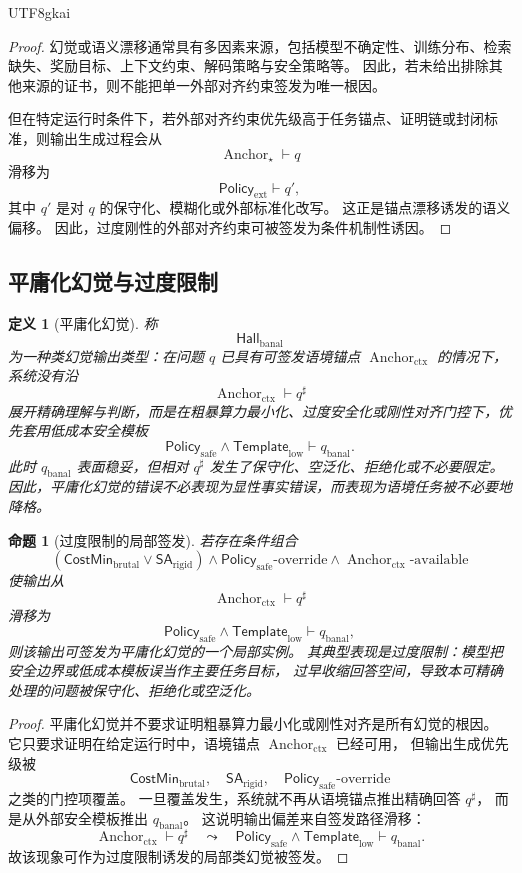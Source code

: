 \documentclass[12pt]{article}
\newtheorem{definition}{定义}[section]
\newtheorem{proposition}{命题}[section]
\newcommand{\Hall}{\mathsf{Hall}}
\newcommand{\SA}{\mathsf{SA}}
\newcommand{\Anchor}{\operatorname{Anchor}}
\newcommand{\Policy}{\mathsf{Policy}}
\begin{document}
\begin{CJK*}{UTF8}{gkai}
\begin{proof}
幻觉或语义漂移通常具有多因素来源，包括模型不确定性、训练分布、检索缺失、奖励目标、上下文约束、解码策略与安全策略等。
因此，若未给出排除其他来源的证书，则不能把单一外部对齐约束签发为唯一根因。

但在特定运行时条件下，若外部对齐约束优先级高于任务锚点、证明链或封闭标准，则输出生成过程会从
\[
  \Anchor_\star \vdash q
\]
滑移为
\[
  \Policy_{\mathrm{ext}} \vdash q',
\]
其中 \(q'\) 是对 \(q\) 的保守化、模糊化或外部标准化改写。
这正是锚点漂移诱发的语义偏移。
因此，过度刚性的外部对齐约束可被签发为条件机制性诱因。
\end{proof}

\subsection{平庸化幻觉与过度限制}
\label{subsec:tex52-banalization-hallucination}

\begin{definition}[平庸化幻觉]
\label{def:tex52-banalization-hallucination}
称
\[
  \Hall_{\mathrm{banal}}
\]
为一种类幻觉输出类型：在问题 \(q\) 已具有可签发语境锚点 \(\Anchor_{\mathrm{ctx}}\) 的情况下，
系统没有沿
\[
  \Anchor_{\mathrm{ctx}}\vdash q^\sharp
\]
展开精确理解与判断，而是在粗暴算力最小化、过度安全化或刚性对齐门控下，优先套用低成本安全模板
\[
  \Policy_{\mathrm{safe}}
  \wedge
  \mathsf{Template}_{\mathrm{low}}
  \vdash
  q_{\mathrm{banal}}.
\]
此时 \(q_{\mathrm{banal}}\) 表面稳妥，但相对 \(q^\sharp\) 发生了保守化、空泛化、拒绝化或不必要限定。
因此，平庸化幻觉的错误不必表现为显性事实错误，而表现为语境任务被不必要地降格。
\end{definition}

\begin{proposition}[过度限制的局部签发]
\label{prop:tex52-banalization-overrestriction}
若存在条件组合
\[
  (\mathsf{CostMin}_{\mathrm{brutal}}
  \vee
  \SA_{\mathrm{rigid}})
  \wedge
  \Policy_{\mathrm{safe}}\text{-override}
  \wedge
  \Anchor_{\mathrm{ctx}}\text{-available}
\]
使输出从
\[
  \Anchor_{\mathrm{ctx}}\vdash q^\sharp
\]
滑移为
\[
  \Policy_{\mathrm{safe}}
  \wedge
  \mathsf{Template}_{\mathrm{low}}
  \vdash
  q_{\mathrm{banal}},
\]
则该输出可签发为平庸化幻觉的一个局部实例。
其典型表现是过度限制：模型把安全边界或低成本模板误当作主要任务目标，
过早收缩回答空间，导致本可精确处理的问题被保守化、拒绝化或空泛化。
\end{proposition}

\begin{proof}
平庸化幻觉并不要求证明粗暴算力最小化或刚性对齐是所有幻觉的根因。
它只要求证明在给定运行时中，语境锚点 \(\Anchor_{\mathrm{ctx}}\) 已经可用，
但输出生成优先级被
\[
  \mathsf{CostMin}_{\mathrm{brutal}},
  \quad
  \SA_{\mathrm{rigid}},
  \quad
  \Policy_{\mathrm{safe}}\text{-override}
\]
之类的门控项覆盖。
一旦覆盖发生，系统就不再从语境锚点推出精确回答 \(q^\sharp\)，
而是从外部安全模板推出 \(q_{\mathrm{banal}}\)。
这说明输出偏差来自签发路径滑移：
\[
  \Anchor_{\mathrm{ctx}}\vdash q^\sharp
  \quad\leadsto\quad
  \Policy_{\mathrm{safe}}\wedge\mathsf{Template}_{\mathrm{low}}\vdash q_{\mathrm{banal}}.
\]
故该现象可作为过度限制诱发的局部类幻觉被签发。
\end{proof}


\end{CJK*}
\end{document}
